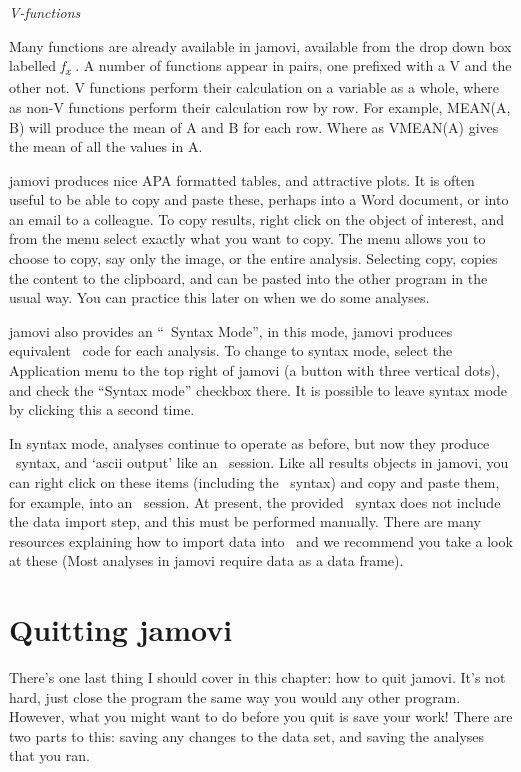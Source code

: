 {\it V-functions}

Many functions are already available in jamovi, available from the drop down box labelled {\it f\textsubscript{x}} . A number of functions appear in pairs, one prefixed with a V and the other not. V functions perform their calculation on a variable as a whole, where as non-V functions perform their calculation row by row. For example, MEAN(A, B) will produce the mean of A and B for each row. Where as VMEAN(A) gives the mean of all the values in A.


jamovi produces nice APA formatted tables, and attractive plots. It is often useful to be able to copy and paste these, perhaps into a Word document, or into an email to a colleague. To copy results, right click on the object of interest, and from the menu select exactly what you want to copy. The menu allows you to choose to copy, say only the image, or the entire analysis. Selecting copy, copies the content to the clipboard, and can be pasted into the other program in the usual way. You can practice this later on when we do some analyses.


jamovi also provides an “\R\ Syntax Mode”, in this mode, jamovi produces equivalent \R\ code for each analysis. To change to syntax mode, select the Application menu to the top right of jamovi (a button with three vertical dots), and check the “Syntax mode” checkbox there. It is possible to leave syntax mode by clicking this a second time.

In syntax mode, analyses continue to operate as before, but now they produce \R\ syntax, and ‘ascii output’ like an \R\ session. Like all results objects in jamovi, you can right click on these items (including the \R\ syntax) and copy and paste them, for example, into an \R\ session. At present, the provided \R\ syntax does not include the data import step, and this must be performed manually. There are many resources explaining how to import data into \R\, and we recommend you take a look at these (Most analyses in jamovi require data as a data frame).

\section{Quitting jamovi \label{sec:quittingjamovi}}


There's one last thing I should cover in this chapter: how to quit jamovi. It's not hard, just close the program the same way you would any other program. However, what you might want to do before you quit is save your work! There are two parts to this: saving any changes to the data set, and saving the analyses that you ran.

